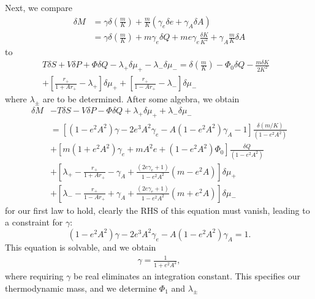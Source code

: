 \documentclass[
twoside,
openright,
frontopenright
]{dmathesis}
\newcommand{\nn}{\nonumber}
\begin{document}
Next, we compare
\begin{align}
\delta M &= \gamma \delta \left ( \frac{m}{K} \right ) 
+ \frac{m}{K} (\gamma_e \delta e + \gamma_A \delta A)
\nn\\&= \gamma \delta \left ( \frac{m}{K} \right ) 
+ m \gamma_e \delta Q + m e \gamma_e \frac{\delta K}{K^2}
+ \gamma_A \frac{m}{K} \delta A
\end{align}
to
\begin{align}
T \delta S + V \delta P + \Phi \delta Q -\lambda_+ \delta \mu_+ - \lambda_-\delta \mu_-
= \delta \left ( \frac{m}{K} \right ) 
- \Phi_0 \delta Q - \frac{m\delta K}{2K^2}&\nn\\
+ \left [ \frac{r_+}{1+Ar_+} - \lambda _+ \right]\delta \mu_+
+ \left [ \frac{r_+}{1-Ar_+} - \lambda _- \right]\delta \mu_-&
\end{align}
where $\lambda_\pm$ are to be determined. After some
algebra, we obtain
\begin{align}
  \label{eq:firstlawder1}
  \delta M &- T \delta S - V \delta P - \Phi \delta Q + \lambda_+ \delta \mu_+ +
             \lambda_-\delta \mu_-\nn\\
           &= \left [ (1-e^2 A^2) \gamma-2 e^3A^2 \gamma_e -
             A(1-e^2 A^2) \gamma_A -1 \right] \frac{ \delta \left ( {m/K} \right )
             }{(1-e^2A^2)} \nn\\
           &+ \left [ m (1+e^2 A^2) \gamma_e + mA^2 e +(1-e^2 A^2)
             \Phi_0 \right] \frac{ \delta Q }{(1-e^2A^2) }\nn\\
           &+ \left [ \lambda_+ -\frac{r_+}{1+Ar_+} - \gamma_A +
             \frac{(2e\gamma_e+1)}{1-e^2 A^2} \left ( m - e^2A \right) \right]
             \delta \mu_+\nn\\
           &+ \left [ \lambda_- - \frac{r_+}{1-Ar_+} + \gamma_A
             +\frac{(2e\gamma_e+1)}{1-e^2 A^2} \left ( m + e^2A \right) \right]
             \delta \mu_- 
\end{align}
for our first law to hold, clearly the RHS of this equation must vanish, leading
to a constraint for $\gamma$:
\begin{equation}
(1-e^2 A^2) \gamma-2 e^3A^2 \gamma_e - A(1-e^2 A^2) \gamma_A =1.
\end{equation}
This equation is solvable, and we obtain
\begin{align}
  \gamma = \frac{1}{1+e^2 A^2},
\end{align}
where requiring $\gamma$ be real eliminates an integration constant. This
specifies our thermodynamic mass, and we determine $\Phi_1$ and $\lambda_\pm$
\end{document}
